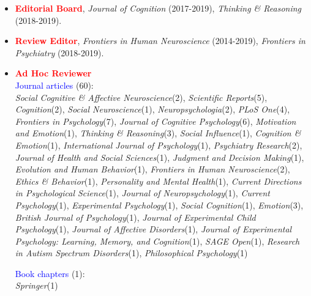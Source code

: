 \documentclass[10pt]{article}
\begin{document}
	
	\begin{itemize}
	
	\item \textcolor{red}{{\textbf{Editorial Board}}}, \textit{Journal of Cognition} (2017-2019), \textit{Thinking \& Reasoning} (2018-2019).
	
	
	\item \textcolor{red}{{\textbf{Review Editor}}}, \textit{Frontiers in Human Neuroscience} (2014-2019), \textit{Frontiers in Psychiatry} (2018-2019).
	
	
	\item \textcolor{red}{{\textbf{Ad Hoc Reviewer}}}\\
	\textcolor{blue}{{Journal articles}} (60):\\
	\textit{Social Cognitive \& Affective Neuroscience}(2), \textit{Scientific Reports}(5), \textit{Cognition}(2), \textit{Social Neuroscience}(1), 
	\textit{Neuropsychologia}(2), \textit{PLoS One}(4), \textit{Frontiers in Psychology}(7), \textit{Journal of Cognitive Psychology}(6), 
	\textit{Motivation and Emotion}(1), \textit{Thinking \& Reasoning}(3), \textit{Social Influence}(1), \textit{Cognition \& Emotion}(1),
	\textit{International Journal of Psychology}(1),  \textit{Psychiatry Research}(2),
	\textit{Journal of Health and Social Sciences}(1),
	\textit{Judgment and Decision Making}(1), \textit{Evolution and Human Behavior}(1),   \textit{Frontiers in Human Neuroscience}(2), 
	\textit{Ethics \& Behavior}(1), \textit{Personality and Mental Health}(1),  \textit{Current Directions in Psychological Science}(1),
	\textit{Journal of Neuropsychology}(1), \textit{Current Psychology}(1), \textit{Experimental Psychology}(1), \textit{Social Cognition}(1), 
	\textit{Emotion}(3), \textit{British Journal of Psychology}(1), \textit{Journal of Experimental Child Psychology}(1), \textit{Journal of Affective Disorders}(1), \textit{Journal of Experimental Psychology: Learning, Memory, and Cognition}(1), \textit{SAGE Open}(1), \textit{Research in Autism Spectrum Disorders}(1), \textit{Philosophical Psychology}(1)  
	
	\textcolor{blue}{Book chapters} (1):\\
	\textit{Springer}(1)
	
	\end{itemize}
	
	
\end{document}
